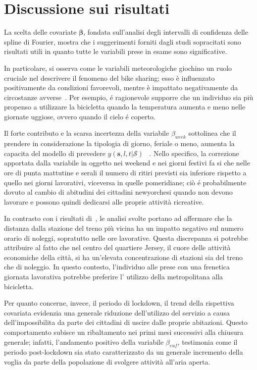 \section[Discussione sui risultati]{Discussione sui risultati}
La scelta delle covariate $\boldsymbol{\beta}$, fondata sull'analisi degli intervalli di confidenza delle spline di Fourier, mostra che i suggerimenti forniti dagli studi sopracitati sono risultati utili in quanto tutte le variabili prese in esame sono significative. \par In particolare, si osserva come le variabili meteorologiche giochino un ruolo cruciale nel descrivere il fenomeno del bike sharing; esso è influenzato positivamente da condizioni favorevoli, mentre è impattato negativamente da circostanze avverse~\citep{paper_bike_sharing_e_meteo}. Per esempio, é ragionevole supporre che un individuo sia più propenso a utilizzare la bicicletta quando la temperatura aumenta e meno nelle giornate uggiose, ovvero quando il cielo é coperto.
\par Il forte contributo e la scarsa incertezza della variabile $\beta_{week}$ sottolinea che il prendere in considerazione la tipologia di giorno, feriale o meno, aumenta la capacita del modello di prevedere $y(\mathbf{s}, l, t| \mathcal{S})$ ~\citep{paper_bike_sharing_Otto}. Nello specifico, la correzione apportata dalla variabile in oggetto nei weekend e nei giorni festivi fa si che nelle ore di punta mattutine e serali il numero di ritiri previsti sia inferiore rispetto a quello nei giorni lavorativi, viceversa in quelle pomeridiane; ciò é probabilmente dovuto al cambio di abitudini dei cittadini newyorchesi quando non devono lavorare e possono quindi dedicarsi alle proprie attività ricreative.
\par In contrasto con i risultati di~\cite{paper_bike_sharing_e_meteo}, le analisi svolte portano ad affermare che la distanza dalla stazione del treno più vicina ha un impatto negativo sul numero orario di noleggi, sopratutto nelle ore lavorative. Questa discrepanza si potrebbe attribuire al fatto che nel centro del quartiere Jersey, il cuore delle attività economiche della città, si ha un'elevata concentrazione di stazioni sia del treno che di noleggio. In questo contesto, l'individuo alle prese con una frenetica giornata lavorativa potrebbe preferire l' utilizzo della metropolitana alla bicicletta.
\par Per quanto concerne, invece, il periodo di lockdown, il trend della rispettiva covariata evidenzia una generale riduzione dell'utilizzo del servizio a causa dell'impossibilita da parte dei cittadini di uscire dalle proprie abitazioni. Questo comportamento subisce un ribaltamento nei primi mesi successivi alla chiusura generale; infatti, l'andamento positivo della variabile $\beta_{euf}$, testimonia come il periodo post-lockdown sia stato caratterizzato da un generale incremento della voglia da parte della popolazione di svolgere attività all'aria aperta.
